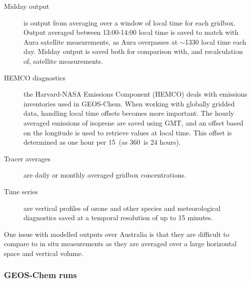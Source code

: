       
      \begin{description}
        \item[Midday output]%
        is output from averaging over a window of local time for each gridbox. 
        Output averaged between 13:00-14:00 local time is saved to match with Aura satellite measurements, as Aura overpasses at $\sim$1330 local time each day.
        Midday output is saved both for comparison with, and recalculation of, satellite measurements.
        \item[HEMCO diagnostics]%
        the Harvard-NASA Emissions Component (HEMCO) deals with emissions inventories used in GEOS-Chem.
        When working with globally gridded data, handling local time offsets becomes more important.
        The hourly averaged emissions of isoprene are saved using GMT, and an offset based on the longitude is used to retrieve values at local time.
        This offset is determined as one hour per 15\degr ~(as 360\degr ~is 24 hours).
        \item[Tracer averages]%
        are daily or monthly averaged gridbox concentrations. 
        \item[Time series]%
        are vertical profiles of ozone and other species and meteorological diagnostics saved at a temporal resolution of up to 15 minutes.
      \end{description}
      
      One issue with modelled outputs over Australia is that they are difficult to compare to in situ measurements as they are averaged over a large horizontal space and vertical volume.
      
    \subsubsection{GEOS-Chem runs}
      \label{Model:GC:simulations:runs}
      
